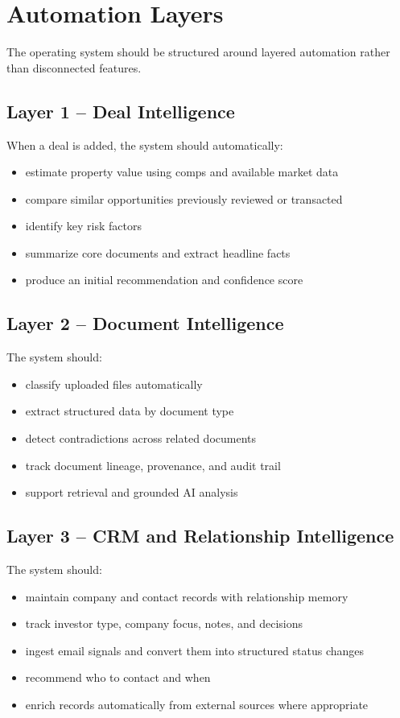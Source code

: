 \documentclass[11pt]{article}
\begin{document}
\section{Automation Layers}

The operating system should be structured around layered automation rather than disconnected features.

\subsection{Layer 1 -- Deal Intelligence}

When a deal is added, the system should automatically:

\begin{itemize}
\item estimate property value using comps and available market data
\item compare similar opportunities previously reviewed or transacted
\item identify key risk factors
\item summarize core documents and extract headline facts
\item produce an initial recommendation and confidence score
\end{itemize}

\subsection{Layer 2 -- Document Intelligence}

The system should:

\begin{itemize}
\item classify uploaded files automatically
\item extract structured data by document type
\item detect contradictions across related documents
\item track document lineage, provenance, and audit trail
\item support retrieval and grounded AI analysis
\end{itemize}

\subsection{Layer 3 -- CRM and Relationship Intelligence}

The system should:

\begin{itemize}
\item maintain company and contact records with relationship memory
\item track investor type, company focus, notes, and decisions
\item ingest email signals and convert them into structured status changes
\item recommend who to contact and when
\item enrich records automatically from external sources where appropriate
\end{itemize}
\end{document}
